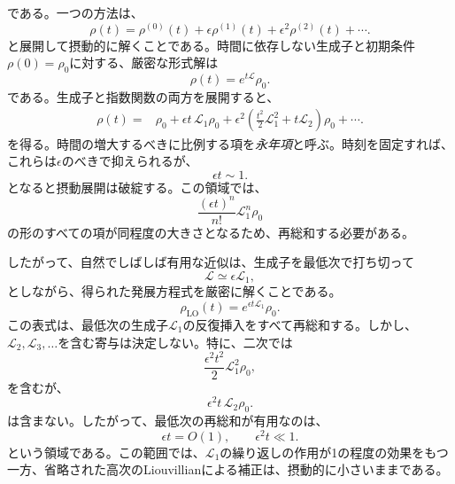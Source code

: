 \documentclass[a4paper,11pt,oneside]{article}
\theoremstyle{definition}
\numberwithin{equation}{section}
\begin{document}
である。一つの方法は、
\begin{equation}
\rho(t)
=
\rho^{(0)}(t)
+
\epsilon \rho^{(1)}(t)
+
\epsilon^{2}\rho^{(2)}(t)
+\cdots .
\end{equation}
と展開して摂動的に解くことである。時間に依存しない生成子と初期条件$\rho(0)=\rho_{0}$に対する、厳密な形式解は
\begin{equation}
\rho(t)
=
e^{t\mathcal{L}}\rho_{0}.
\end{equation}
である。生成子と指数関数の両方を展開すると、
\begin{align}
\rho(t)
={}&
\rho_{0}
+
\epsilon t\,\mathcal{L}_{1}\rho_{0}+
\epsilon^{2}
\left(
\frac{t^{2}}{2}\mathcal{L}_{1}^{2}
+
t\mathcal{L}_{2}
\right)\rho_{0}
+\cdots .
\end{align}
を得る。時間の増大するべきに比例する項を\emph{永年項}と呼ぶ。時刻を固定すれば、これらは$\epsilon$のべきで抑えられるが、
\begin{equation}
\epsilon t
\sim
1.
\end{equation}
となると摂動展開は破綻する。この領域では、
\begin{equation}
\frac{(\epsilon t)^{n}}{n!}\mathcal{L}_{1}^{n}\rho_{0}
\end{equation}
の形のすべての項が同程度の大きさとなるため、再総和する必要がある。



したがって、自然でしばしば有用な近似は、生成子を最低次で打ち切って
\begin{equation}
\mathcal{L}
\simeq
\epsilon \mathcal{L}_{1},
\end{equation}
としながら、得られた発展方程式を厳密に解くことである。
\begin{equation}
\boxed{
\rho_{\mathrm{LO}}(t)
=
e^{\epsilon t\mathcal{L}_{1}}\rho_{0}.
}
\end{equation}
この表式は、最低次の生成子$\mathcal{L}_{1}$の反復挿入をすべて再総和する。しかし、$\mathcal{L}_{2},\mathcal{L}_{3},\ldots$を含む寄与は決定しない。特に、二次では
\begin{equation}
\frac{\epsilon^{2}t^{2}}{2}\mathcal{L}_{1}^{2}\rho_{0},
\end{equation}
を含むが、
\begin{equation}
\epsilon^{2}t\,\mathcal{L}_{2}\rho_{0}.
\end{equation}
は含まない。したがって、最低次の再総和が有用なのは、
\begin{equation}
\epsilon t
=
O(1),
\qquad
\epsilon^{2}t
\ll
1.
\end{equation}
という領域である。この範囲では、$\mathcal{L}_{1}$の繰り返しの作用が1の程度の効果をもつ一方、省略された高次のLiouvillianによる補正は、摂動的に小さいままである。
\end{document}
